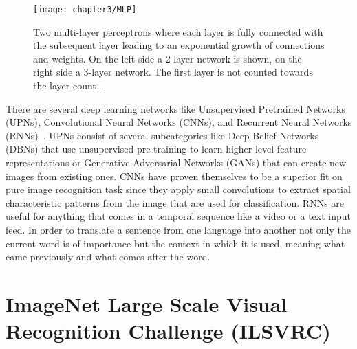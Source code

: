 \begin{figure}[!h]
  \centering
  \caption{Two multi-layer perceptrons where each layer is fully connected with the subsequent layer leading to an exponential growth of connections and weights. On the left side a 2-layer network is shown, on the right side a 3-layer network. The first layer is not counted towards the layer count~\cite{cs231nconvolution}.}
  \texttt{[image: chapter3/MLP]}
  \label{fig:MLP}
\end{figure}

\quad

There are several deep learning networks like Unsupervised Pretrained Networks (UPNs), Convolutional Neural Networks (CNNs), and Recurrent Neural Networks (RNNs)~\cite{typesOfANN, deepLearningAdam}. UPNs consist of several subcategories like Deep Belief Networks (DBNs) that use unsupervised pre-training to learn higher-level feature representations or Generative Adversarial Networks (GANs) that can create new images from existing ones. CNNs have proven themselves to be a superior fit on pure image recognition task since they apply small convolutions to extract spatial characteristic patterns from the image that are used for classification. RNNs are useful for anything that comes in a temporal sequence like a video or a text input feed. In order to translate a sentence from one language into another not only the current word is of importance  but the context in which it is used, meaning what came previously and what comes after the word.\\


\section{ImageNet Large Scale Visual Recognition Challenge (ILSVRC)}

